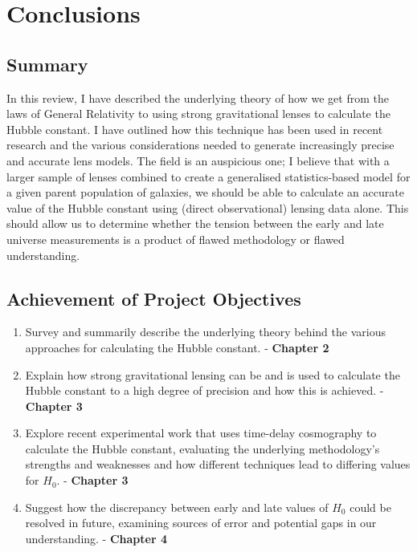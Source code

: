 \documentclass[12pt]{report}
\begin{document}
\chapter{Conclusions}

\vspace{-0.75cm}

\section{Summary}

In this review, I have described the underlying theory of how we get from the laws of General Relativity to using strong gravitational lenses to calculate the Hubble constant. I have outlined how this technique has been used in recent research and the various considerations needed to generate increasingly precise and accurate lens models. The field is an auspicious one; I believe that with a larger sample of lenses combined to create a generalised statistics-based model for a given parent population of galaxies, we should be able to calculate an accurate value of the Hubble constant using (direct observational) lensing data alone. This should allow us to determine whether the tension between the early and late universe measurements is a product of flawed methodology or flawed understanding.

\newpage

\section{Achievement of Project Objectives}

\begin{enumerate}
    \item Survey and summarily describe the underlying theory behind the various approaches for calculating the Hubble constant. - \textbf{Chapter 2}
    \item Explain how strong gravitational lensing can be and is used to calculate the Hubble constant to a high degree of precision and how this is achieved. - \textbf{Chapter 3}
    \item Explore recent experimental work that uses time-delay cosmography to calculate the Hubble constant, evaluating the underlying methodology's strengths and weaknesses and how different techniques lead to differing values for $H_{0}$. - \textbf{Chapter 3}
    \item Suggest how the discrepancy between early and late values of $H_{0}$ could be resolved in future, examining sources of error and potential gaps in our understanding. - \textbf{Chapter 4}
\end{enumerate}
\end{document}
